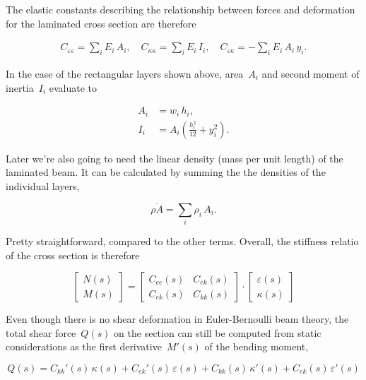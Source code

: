 The elastic constants describing the relationship between forces and deformation for the laminated cross section are therefore

\begin{align}
C_{\varepsilon\varepsilon} = \sum_i E_i\,A_i,\quad
C_{\kappa\kappa} = \sum_i E_i\,I_{i},\quad
C_{\varepsilon\kappa} = -\sum_i E_i\,A_i\,y_i.
\end{align}

In the case of the rectangular layers shown above, area~$A_i$ and second moment of inertia~$I_i$ evaluate to

\begin{align}
A_i &= w_i\,h_i,\\
I_i &= A_i\left(\frac{h_i^2}{12} + y_i^2\right).
\end{align}

Later we're also going to need the linear density (mass per unit length) of the laminated beam. It can be calculated by summing the the densities of the individual layers,

\begin{equation}
\overline{\rho A} = \sum_i \rho_i\,A_i.\label{eq:beam-linear-density}
\end{equation}

Pretty straightforward, compared to the other terms.
Overall, the stiffness relatio of the cross section is therefore

\begin{equation}
\begin{bmatrix}
N(s) \\ M(s)
\end{bmatrix}
=
\begin{bmatrix}
C_{ee}(s) & C_{ek}(s) \\
C_{ek}(s) & C_{kk}(s)
\end{bmatrix}
\cdot
\begin{bmatrix}
\varepsilon(s) \\ \kappa(s)
\end{bmatrix}
\end{equation}

Even though there is no shear deformation in Euler-Bernoulli beam theory, the total shear force~$Q(s)$ on the section can still be computed from static considerations as the first derivative~$M'(s)$ of the bending moment,

\begin{equation}
Q(s) = C_{kk}'(s)\,\kappa(s) + C_{ek}'(s)\,\varepsilon(s) + C_{kk}(s)\,\kappa'(s) + C_{ek}(s)\,\varepsilon'(s)
\end{equation}


